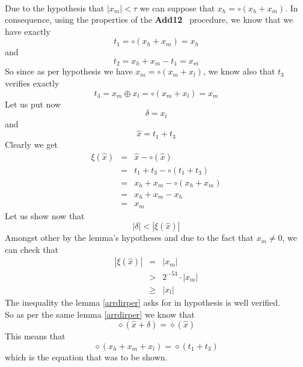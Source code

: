 \documentclass[a4paper,10pt,twoside]{article}
\newenvironment{proof}[1][Proof]{\begin{trivlist}
\item[\hskip \labelsep {\bfseries #1}]}{\end{trivlist}}
\newcommand{\qed}{\nobreak \ifvmode \relax \else \ifdim \lastskip<1.5em \hskip-\lastskip
\hskip1.5em plus0em minus0.5em \fi \nobreak \vrule height0.75em width0.5em depth0.25em\fi}
\newcommand{\hi}{\ensuremath{\mathit{h}}}
\newcommand{\mi}{\ensuremath{\mathit{m}}}
\newcommand{\lo}{\ensuremath{\mathit{l}}}
\newcommand{\Add}{{\bf Add12}}
\begin{document}
\begin{proof} ~ \\
Due to the hypothesis that $\left \vert x_\mi \right \vert < \tau$ we can suppose that $x_\hi = \circ \left( x_\hi + x_\mi \right)$. 
In consequence, using the properties of the \Add~ procedure, we know that we have exactly
$$t_1 = \circ \left( x_\hi + x_\mi \right) = x_\hi$$
and
$$t_2 = x_\hi + x_\mi - t_1 = x_\mi$$
So since as per hypothesis we have $x_\mi = \circ \left( x_\mi + x_\lo \right)$, we know also that 
$t_3$ verifies exactly
$$t_3 = x_\mi \oplus x_\lo = \circ\left( x_\mi + x_\lo \right) = x_\mi$$
Let us put now
$$\delta = x_\lo$$
and
$$\hat{x} = t_1 + t_3$$
Clearly we get
\begin{eqnarray*}
\xi\left( \hat{x} \right) & = & \hat{x} - \circ\left( \hat{x} \right) \\
& = & t_1 + t_3 - \circ\left( t_1 + t_3 \right) \\
& = & x_\hi + x_\mi - \circ\left( x_\hi + x_\mi \right) \\
& = & x_\hi + x_\mi - x_\hi \\
& = & x_\mi
\end{eqnarray*}
Let us show now that
$$\left \vert \delta \right \vert < \left \vert \xi\left( \hat{x} \right) \right \vert$$
Amongst other by the lemma's hypotheses and due to the fact that $x_\mi \not = 0$, we can check that
\begin{eqnarray*}
\left \vert \xi\left( \hat{x} \right) \right \vert 
& = & \left \vert x_\mi \right \vert \\
& > & 2^{-53} \cdot \left \vert x_\mi \right \vert \\
& \geq & \left \vert x_\lo \right \vert 
\end{eqnarray*}
The inequality the lemma \ref{arrdirper} asks for in hypothesis is well verified.\\
So as per the same lemma \ref{arrdirper} we know that
$$\diamond \left( \hat{x} + \delta \right) = \diamond\left( \hat{x} \right)$$
This means that 
$$\diamond \left( x_\hi + x_\mi + x_\lo \right) = \diamond\left( t_1 + t_3 \right)$$
which is the equation that was to be shown.\qed
\end{proof}
\end{document}
